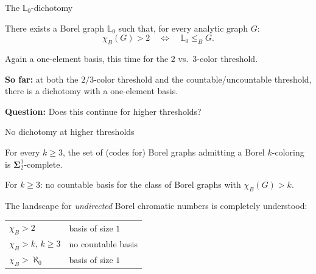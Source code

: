 \documentclass[aspectratio=169, 12pt]{beamer}
\begin{document}

\begin{frame}{The $\mathbb{L}_0$-dichotomy}
\begin{theorem}
There exists a Borel graph $\mathbb{L}_0$ such that, for every analytic graph $G$:
$$
\chi_B(G) > 2
\quad\Longleftrightarrow\quad
\mathbb{L}_0 \leq_B G.
$$
\end{theorem}

Again a one-element basis, this time for the $2$ vs.\ $3$-color threshold.

\pause
\medskip

\textbf{So far:} at both the $2/3$-color threshold and the countable/uncountable threshold, there is a dichotomy with a one-element basis.

\medskip

\textbf{Question:} Does this continue for higher thresholds?
\end{frame}


\begin{frame}{No dichotomy at higher thresholds}
\begin{theorem}
For every $k \geq 3$, the set of (codes for) Borel graphs admitting a Borel $k$-coloring is $\mathbf{\Sigma}^1_2$-complete.
\end{theorem}

\pause
\medskip

\begin{corollary}
For $k \geq 3$: no countable basis for the class of Borel graphs with $\chi_B(G) > k$.
\end{corollary}

\medskip

The landscape for \emph{undirected} Borel chromatic numbers is completely understood:
\begin{center}
\begin{tabular}{ll}
	$\chi_B > 2$ & basis of size $1$ \\
	$\chi_B > k$, $k\geq 3$ & no countable basis \\
	$\chi_B > \aleph_0$ & basis of size $1$ \\
\end{tabular}
\end{center}
\end{frame}

\end{document}

